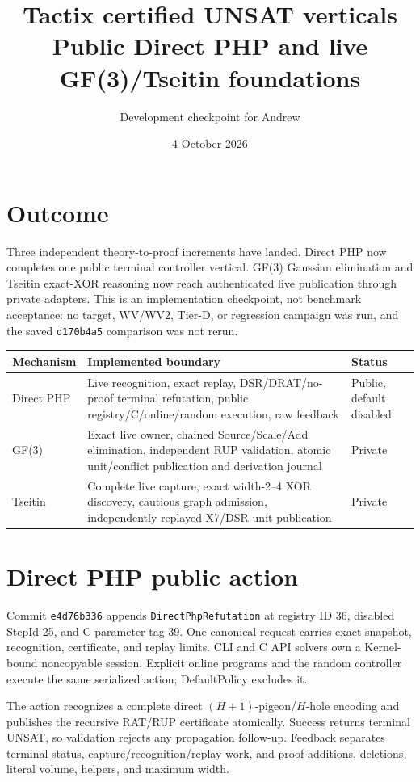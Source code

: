 \documentclass[11pt]{article}
\title{Tactix certified UNSAT verticals\\Public Direct PHP and live GF(3)/Tseitin foundations}
\author{Development checkpoint for Andrew}
\date{4 October 2026}
\newcommand{\code}[1]{\texttt{#1}}
\begin{document}
\maketitle

\section*{Outcome}

Three independent theory-to-proof increments have landed. Direct PHP now
completes one public terminal controller vertical. GF(3) Gaussian elimination
and Tseitin exact-XOR reasoning now reach authenticated live publication through
private adapters. This is an implementation checkpoint, not benchmark
acceptance: no target, WV/WV2, Tier-D, or regression campaign was run, and the
saved \code{d170b4a5} comparison was not rerun.

\begin{center}
\begin{tabularx}{\textwidth}{@{}lXl@{}}
\toprule
Mechanism & Implemented boundary & Status \\
\midrule
Direct PHP & Live recognition, exact replay, DSR/DRAT/no-proof terminal
refutation, public registry/C/online/random execution, raw feedback & Public,
default disabled \\
GF(3) & Exact live owner, chained Source/Scale/Add elimination, independent
RUP validation, atomic unit/conflict publication and derivation journal &
Private \\
Tseitin & Complete live capture, exact width-2--4 XOR discovery, cautious graph
admission, independently replayed X7/DSR unit publication & Private \\
\bottomrule
\end{tabularx}
\end{center}

\section*{Direct PHP public action}

Commit \code{e4d76b336} appends \code{DirectPhpRefutation} at registry ID 36,
disabled StepId 25, and C parameter tag 39. One canonical request carries exact
snapshot, recognition, certificate, and replay limits. CLI and C API solvers own
a Kernel-bound noncopyable session. Explicit online programs and the random
controller execute the same serialized action; DefaultPolicy excludes it.

The action recognizes a complete direct $(H+1)$-pigeon/$H$-hole encoding and
publishes the recursive RAT/RUP certificate atomically. Success returns terminal
UNSAT, so validation rejects any propagation follow-up. Feedback separates
terminal status, capture/recognition/replay work, and proof additions,
deletions, literal volume, helpers, and maximum width.
\end{document}
